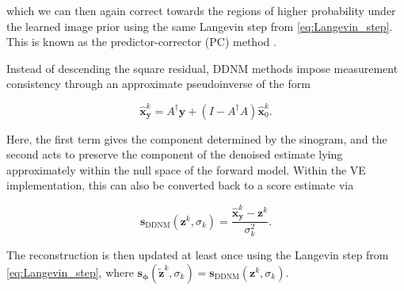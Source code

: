 which we can then again correct towards the regions of higher probability under the learned image prior using the same Langevin step from \eqref{eq:Langevin_step}. This is known as the predictor-corrector (PC) method \cite{}.

Instead of descending the square residual, DDNM methods \cite{} impose measurement consistency through an approximate pseudoinverse of the form

\begin{equation}
\hat{\mathbf{x}}_{\mathbf{y}}^k
=
A^\dagger\mathbf{y}
+
(I-A^\dagger A)\hat{\mathbf{x}}_0^k.
\label{eq:ddnm_measurement_consistency}
\end{equation}

Here, the first term gives the component determined by the sinogram, and the second acts to preserve the component of the denoised estimate lying approximately within the null space of the forward model. Within the VE implementation, this can also be converted back to a score estimate via

\begin{equation}
\mathbf{s}_{\mathrm{DDNM}}(\mathbf{z}^k,\sigma_k)
=
\frac{
\hat{\mathbf{x}}_{\mathbf{y}}^k-\mathbf{z}^k
}{\sigma_k^2}.
\label{eq:ddnm_score_estimate}
\end{equation}

The reconstruction is then updated at least once using the Langevin step from \eqref{eq:Langevin_step}, where $\mathbf{s}_{\boldsymbol{\phi}}(\tilde{\mathbf{z}}^k,\sigma_k)=\mathbf{s}_{\mathrm{DDNM}}(\mathbf{z}^k,\sigma_k)$.
